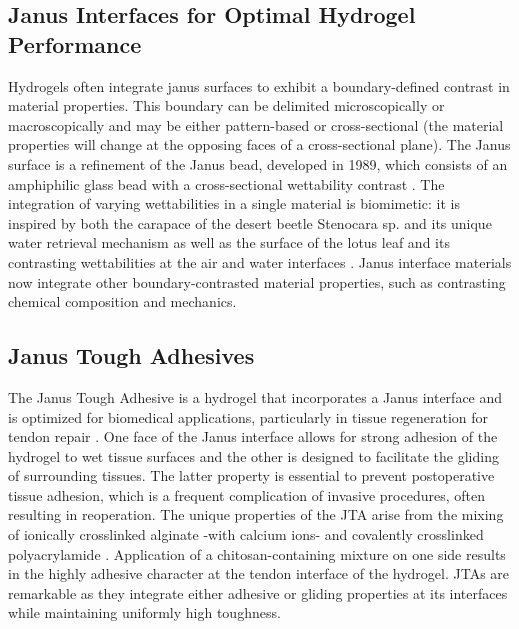 \subsection{Janus Interfaces for Optimal Hydrogel Performance}
Hydrogels often integrate janus surfaces to exhibit a boundary-defined contrast in material properties. This boundary can be delimited microscopically or macroscopically and may be either pattern-based or cross-sectional (the material properties will change at the opposing faces of a cross-sectional plane). The Janus surface is a refinement of the Janus bead, developed in 1989, which consists of an amphiphilic glass bead with a cross-sectional wettability contrast \autocite{janus_interface}. The integration of varying wettabilities in a single material is biomimetic: it is inspired by both the carapace of the desert beetle Stenocara sp. and its unique water retrieval mechanism as well as the surface of the lotus leaf and its contrasting wettabilities at the air and water interfaces \autocite{janus_interface}. Janus interface materials now integrate other boundary-contrasted material properties, such as contrasting chemical composition and mechanics. 

\subsection{Janus Tough Adhesives}
The Janus Tough Adhesive is a hydrogel that incorporates a Janus interface and is optimized for biomedical applications, particularly in tissue regeneration for tendon repair \autocite{jta_poc}. One face of the Janus interface allows for strong adhesion of the hydrogel to wet tissue surfaces and the other is designed to facilitate the gliding of surrounding tissues. The latter property is essential to prevent postoperative tissue adhesion, which is a frequent complication of invasive procedures, often resulting in reoperation. The unique properties of the JTA arise from the mixing of ionically crosslinked alginate -with calcium ions- and covalently crosslinked polyacrylamide \autocite{jta_poc}. Application of a chitosan-containing mixture on one side results in the highly adhesive character at the tendon interface of the hydrogel. JTAs are remarkable as they integrate either adhesive or gliding properties at its interfaces while maintaining uniformly high toughness. 

